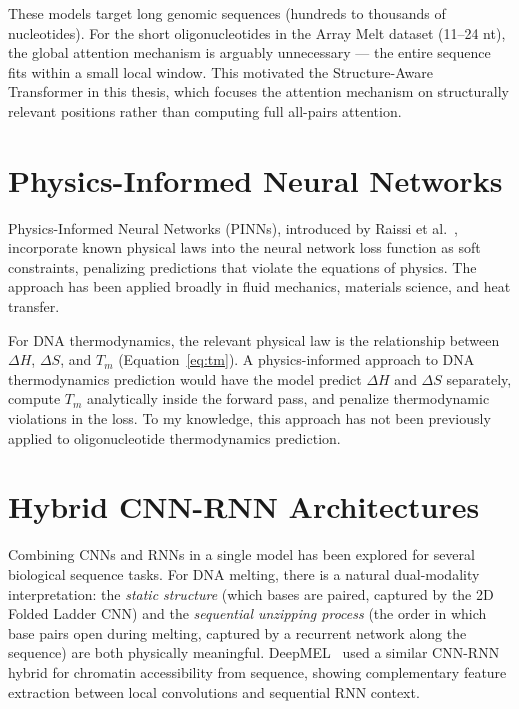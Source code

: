 \documentclass[12pt,oneside,letterpaper]{report}
\begin{document}
These models target long genomic sequences (hundreds to thousands of nucleotides). For the short oligonucleotides in the Array Melt dataset (11--24 nt), the global attention mechanism is arguably unnecessary --- the entire sequence fits within a small local window. This motivated the Structure-Aware Transformer in this thesis, which focuses the attention mechanism on structurally relevant positions rather than computing full all-pairs attention.

\section{Physics-Informed Neural Networks}

Physics-Informed Neural Networks (PINNs), introduced by Raissi et al.~\cite{raissi2019}, incorporate known physical laws into the neural network loss function as soft constraints, penalizing predictions that violate the equations of physics. The approach has been applied broadly in fluid mechanics, materials science, and heat transfer.

For DNA thermodynamics, the relevant physical law is the relationship between $\Delta H$, $\Delta S$, and $T_m$ (Equation~\ref{eq:tm}). A physics-informed approach to DNA thermodynamics prediction would have the model predict $\Delta H$ and $\Delta S$ separately, compute $T_m$ analytically inside the forward pass, and penalize thermodynamic violations in the loss. To my knowledge, this approach has not been previously applied to oligonucleotide thermodynamics prediction.

\section{Hybrid CNN-RNN Architectures}

Combining CNNs and RNNs in a single model has been explored for several biological sequence tasks. For DNA melting, there is a natural dual-modality interpretation: the \textit{static structure} (which bases are paired, captured by the 2D Folded Ladder CNN) and the \textit{sequential unzipping process} (the order in which base pairs open during melting, captured by a recurrent network along the sequence) are both physically meaningful. DeepMEL~\cite{deepmel2020} used a similar CNN-RNN hybrid for chromatin accessibility from sequence, showing complementary feature extraction between local convolutions and sequential RNN context.

\end{document}
